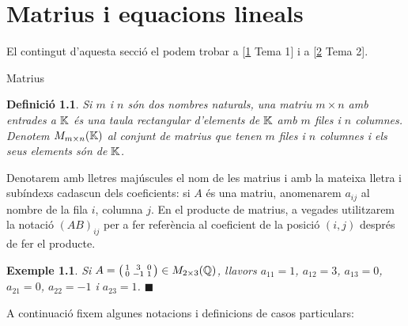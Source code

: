 \documentclass[
  11pt,
]{book}
\makeatletter
\numberwithin{dummy}{section}
\theoremstyle{maincolornumbox}
\theoremstyle{blacknumex}
\newtheorem{exampleT}{Exemple}[chapter]
\theoremstyle{blacknumbox}
\newtheorem{definitionT}{Definició}[chapter]
\theoremstyle{maincolornum}
\newenvironment{definition}{\begin{dBox}\begin{definitionT}}{\end{definitionT}\end{dBox}}
\newenvironment{example}{\begin{exampleT}}{\hfill{\tiny\ensuremath{\blacksquare}}\end{exampleT}}
\renewcommand{\section}{\@startsection{section}{1}{\z@}
{-4ex \@plus -1ex \@minus -.4ex}
{1ex \@plus.2ex }
{\normalfont\large\sffamily\bfseries}}
\newlength\esp
\makeatother
\begin{document}
\hypertarget{matrius-i-equacions-lineals}{%
\chapter{Matrius i equacions lineals}\label{matrius-i-equacions-lineals}}

El contingut d'aquesta secció el podem trobar a {[}\protect\hyperlink{ref-Bret}{1} Tema 1{]} i a
{[}\protect\hyperlink{ref-NaXa}{2} Tema 2{]}.

\hypertarget{matrius}{%
\section{Matrius}\label{matrius}}

\begin{definition}
Si \(m\) i \(n\) són dos nombres naturals, una \emph{matriu \(m\times n\) amb
entrades a \(\mathbb{K}\)} és una taula rectangular d'elements de \(\mathbb{K}\) amb \(m\)
files i \(n\) columnes. Denotem \(M_{m\times n}(\mathbb{K})\) al conjunt de matrius
que tenen \(m\) files i \(n\) columnes i els seus elements són de \(\mathbb{K}\).
\end{definition}

Denotarem amb lletres majúscules el nom de les matrius i amb la mateixa
lletra i subíndexs cadascun dels coeficients: si \(A\) és una matriu,
anomenarem \(a_{ij}\) al nombre de la fila \(i\), columna \(j\). En el
producte de matrius, a vegades utilitzarem la notació \((AB)_{ij}\) per a
fer referència al coeficient de la posició \((i,j)\) després de fer el
producte.

\begin{example}
Si \(A=\big(\begin{smallmatrix}  1 & 3 & 0 \\ 0 & -1 & 1  \end{smallmatrix}\big) \in M_{2\times3}(\mathbb{Q})\), llavors \(a_{11}=1\),
\(a_{12}=3\), \(a_{13}=0\), \(a_{21}=0\), \(a_{22}=-1\) i \(a_{23}=1\).
\end{example}

A continuació fixem algunes notacions i definicions de casos
particulars:
\end{document}
